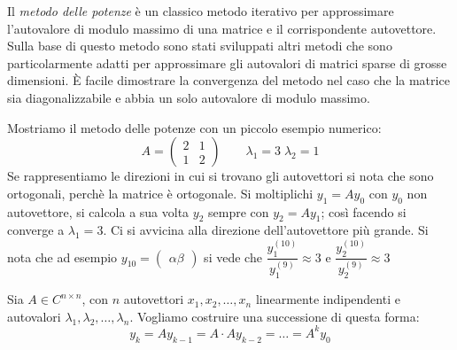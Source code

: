 Il \emph{metodo delle potenze} \`e  un classico metodo iterativo per
approssimare l'autovalore di modulo massimo di una matrice e il corrispondente
autovettore. Sulla base di questo metodo sono stati sviluppati altri metodi
che sono
particolarmente adatti per approssimare gli autovalori di matrici sparse di
grosse dimensioni. \`E  facile dimostrare la convergenza del metodo nel caso
che la matrice sia diagonalizzabile e abbia un solo autovalore di modulo
massimo.
\begin{example}
Mostriamo il metodo delle potenze con un piccolo esempio numerico:
  $$A =
  \begin{pmatrix}
    2 & 1 \\
    1 & 2
  \end{pmatrix}
  \qquad 
  \lambda_1 = 3 \; \lambda_2 = 1
  $$
Se rappresentiamo le direzioni in cui si trovano gli autovettori si nota che sono
ortogonali, perch\`e la matrice \`e ortogonale.
Si moltiplichi $y_1 = Ay_0$ con $y_0$ non autovettore, si calcola a
sua volta $y_2$ sempre con $y_2 = Ay_1$; cos\`i facendo si converge a $\lambda_1 = 3$.
Ci si avvicina alla direzione dell'autovettore pi\`u grande. Si nota
che ad esempio
$y_{10} =
\begin{pmatrix}
  \alpha
  \beta
\end{pmatrix}
$
si vede che
$\dfrac{y_1^{(10)}}{y_1^{(9)}} \approx 3$
e
$\dfrac{y_2^{(10)}}{y_2^{(9)}} \approx 3$
\end{example}
 
Sia $A \in C^{n \times n}$, con $n$ autovettori $x_1, x_2,\ldots, x_n$
linearmente indipendenti e autovalori $\lambda_1, \lambda_2 , \ldots,
\lambda_n$. Vogliamo costruire una successione di questa forma:
$$ y_k = A y_{k-1} = A \cdot A y_{k-2} = \ldots = A^{k} y_0$$

